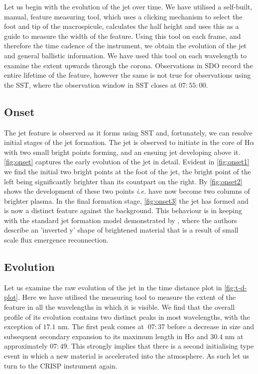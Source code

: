 \documentclass{emulateapj}
\begin{document}
Let us begin with the evolution of the jet over time. 
We have utilised a self-built, manual, feature measuring tool, which uses a clicking mechanism to select the foot and tip of the macrospicule, calculates the half height and uses this as a guide to measure the width of the feature.
Using this tool on each frame, and therefore the time cadence of the instrument, we obtain the evolution of the jet and general ballistic information.
We have used this tool on each wavelength to examine the extent upwards through the corona. 
Observations in SDO record the entire lifetime of the feature, however the same is not true for observations using the SST, where the observation window in SST closes at $07:55:00$.

\subsection{Onset}
The jet feature is observed as it forms using SST and, fortunately, we can resolve initial stages of the jet formation.
The jet is observed to initiate in the core of H$\alpha$ with two small bright points forming, and an ensuing jet developing above it. 
\cref{fig:onset} captures the early evolution of the jet in detail.
Evident in \cref{fig:onset1} we find the initial two bright points at the foot of the jet, the bright point of the left being significantly brighter than its countpart on the right.
By \cref{fig:onset2} shows the development of these two points \emph{i.e.} have now become two columns of brighter plasma.
In the final formation stage, \cref{fig:onset3} the jet has formed and is now a distinct feature against the background.
This behaviour is in keeping with the standard jet formation model demonstrated by \cite{Shibata1992}, where the authors describe an 'inverted y' shape of brightened material that is a result of small scale flux emergence reconnection.



\subsection{Evolution}
Let us examine the raw evolution of the jet in the time distance plot in \cref{fig:t-d-plot}.
Here we have utilised the measuring tool to measure the extent of the feature in all the wavelengths in which it is visible.
We find that the overall profile of its evolution contains two distinct peaks in most wavelengths, with the exception of $17.1$ nm.
The first peak comes at $~07:37$ before a decrease in size and subsequent secondary expansion to its maximum length in H$\alpha$ and $30.4$ nm at approximately $07:49$.
This strongly implies that there is a second initialising type event in which a new material is accelerated into the atmosphere.
As such let us turn to the CRISP instrument again.
\end{document}

